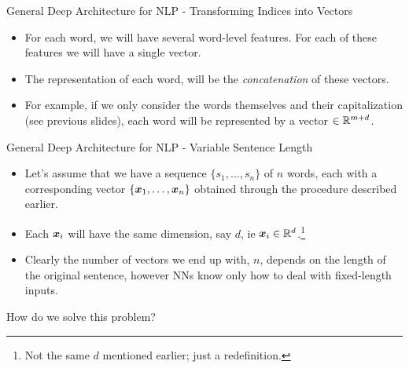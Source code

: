 \documentclass[handout]{beamer} %
\begin{document}
  \begin{frame}{General Deep Architecture for NLP - Transforming Indices into Vectors}
       \begin{itemize}[<+->]

         \item For each word, we will have several word-level features. For each of
         these features we will have a single vector.
     \item The representation of each word, will be the \textit{concatenation} of these
           vectors.
         \item For example, if we only consider the words themselves and their
             capitalization (see previous slides), each word will be represented
             by a vector $\in{\mathbb{R}}^{m+d}$.
      \end{itemize}
  \end{frame}

  \begin{frame}{General Deep Architecture for NLP - Variable Sentence Length}
       \begin{itemize}[<+->]
           \item Let's assume that we have a sequence $\{s_1, \ldots, s_n\}$ of
               $n$ words, each with a corresponding vector
               $\{{\bm{x}}_1,\ldots,{\bm{x}}_n\}$ obtained through the
               procedure described earlier.
           \item Each ${\bm{x}}_i$ will have the same dimension, say
               $d$, ie ${\bm{x}}_i\in{\mathbb{R}}^d$.\footnote[frame]{Not the
               same $d$ mentioned earlier; just a redefinition.}
           \item Clearly the number of vectors we end up with, $n$, depends on 
               the length of the original sentence, however
               NNs know only how to deal with fixed-length inputs.
      \end{itemize}
      \begin{center}
          \pause[\thebeamerpauses]How do we solve this problem?
      \end{center}
  \end{frame}
\end{document}
